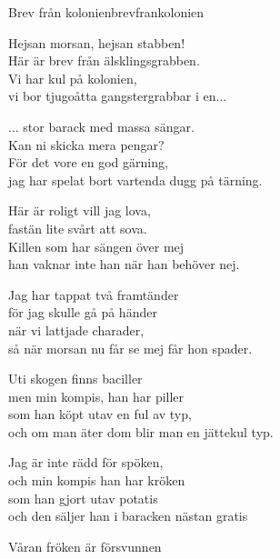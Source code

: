 \begin{song}{Brev från kolonien}{brevfrankolonien}
\begin{vers}
Hejsan morsan, hejsan stabben! \\
Här är brev från älsklingsgrabben.\\
Vi har kul på kolonien,\\
vi bor tjugoåtta gangstergrabbar i en...\\
\end{vers}
\begin{vers}
... stor barack med massa sängar. \\
Kan ni skicka mera pengar?\\
För det vore en god gärning,\\
jag har spelat bort vartenda dugg på tärning.\\
\end{vers}
\begin{vers}
Här är roligt vill jag lova, \\
fastän lite svårt att sova.\\
Killen som har sängen över mej\\
han vaknar inte han när han behöver nej.\\
\end{vers}
\begin{vers}
Jag har tappat två framtänder \\
för jag skulle gå på händer\\
när vi lattjade charader,\\
så när morsan nu får se mej får hon spader.\\
\end{vers}
\begin{vers}
Uti skogen finns baciller \\
men min kompis, han har piller\\
som han köpt utav en ful av typ,\\
och om man äter dom blir man en jättekul typ.\\
\end{vers}
\begin{vers}
Jag är inte rädd för spöken, \\
och min kompis han har kröken\\
som han gjort utav potatis\\
och den säljer han i baracken nästan gratis\\
\end{vers}
\begin{vers}
Våran fröken är försvunnen \\

\end{vers}
\end{song}
